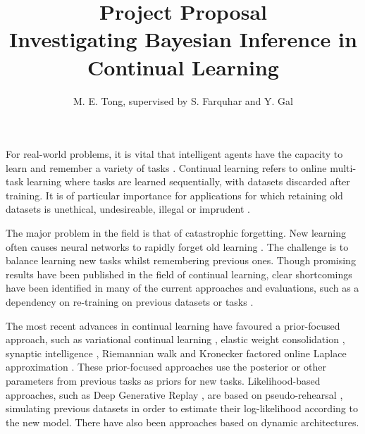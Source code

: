 \documentclass[a4paper,11=0pt]{article}
\title{\vspace*{-2em}\textbf{Project Proposal}\\ \vspace{0.25em} \Large Investigating Bayesian Inference in Continual Learning\vspace*{-0.75em}}
\author{M. E. Tong, supervised by S. Farquhar and Y. Gal}
\date{}
\begin{document}
\maketitle


\vspace{-1em}
For real-world problems, it is vital that intelligent agents have the capacity to learn and remember a variety of tasks \cite{ewc}. Continual learning refers to online multi-task learning where tasks are learned sequentially, with datasets discarded after training. It is of particular importance for applications for which retaining old datasets is unethical, undesireable, illegal or imprudent \cite{unifying, robust}. %

The major problem in the field is that of catastrophic forgetting. New learning often causes neural networks to rapidly forget old learning \cite{catastrophic}. The challenge is to balance learning new tasks whilst remembering previous ones. Though promising results have been published in the field of continual learning, clear shortcomings have been identified in many of the current approaches and evaluations, such as a dependency on re-training on previous datasets or tasks \cite{robust}. 

The most recent advances in continual learning have favoured a prior-focused approach, such as variational continual learning \cite{vcl}, elastic weight consolidation \cite{ewc}, synaptic intelligence \cite{si}, Riemannian walk \cite{rw} and Kronecker factored online Laplace approximation \cite{ritter}. These prior-focused approaches use the posterior or other parameters from previous tasks as priors for new tasks. Likelihood-based approaches, such as Deep Generative Replay \cite{dgr}, are based on pseudo-rehearsal \cite{robins}, simulating previous datasets in order to estimate their log-likelihood according to the new model. There have also been approaches based on dynamic architectures. %

\end{document}
